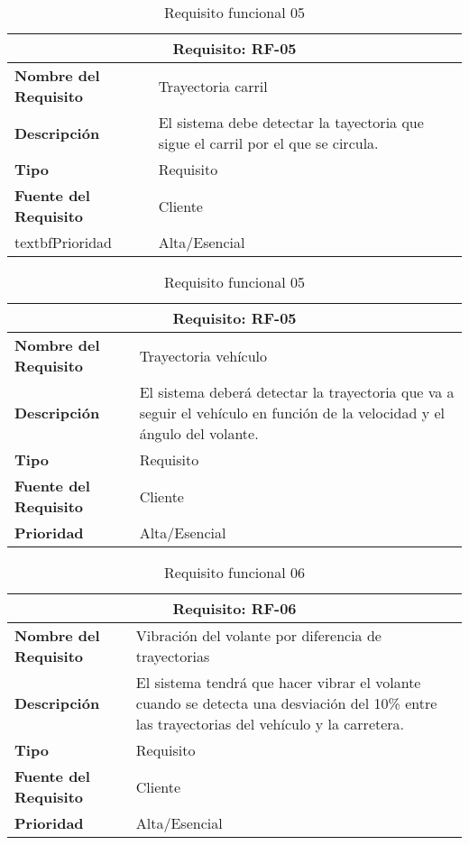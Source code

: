 \begin{table}[H]
\begin{center}
\begin{tabular}{p{} p{7cm}}
\multicolumn{2}{c}{\textbf{Requisito: RF-05} } \\
\hline \hline
\textbf{Nombre del Requisito} & Trayectoria carril\\
\hline
\textbf{Descripción} & El sistema debe detectar la tayectoria que sigue el carril por el que se circula. \\
\hline
\textbf{Tipo} & Requisito  \\
\hline
\textbf{Fuente del Requisito} & Cliente  \\
\hline
textbf{Prioridad} & Alta/Esencial  \\ \hline
\end{tabular}
\caption{Requisito funcional 05}
\label{tab:personal}
\end{center}
\end{table}

\begin{table}[H]
\begin{center}
\begin{tabular}{p{} p{7cm}}
\multicolumn{2}{c}{\textbf{Requisito: RF-05} } \\
\hline \hline
\textbf{Nombre del Requisito} & Trayectoria vehículo\\
\hline
\textbf{Descripción} & El sistema deberá detectar la trayectoria que va a seguir el vehículo en función de la velocidad y el ángulo del volante. \\
\hline
\textbf{Tipo} & Requisito  \\
\hline
\textbf{Fuente del Requisito} & Cliente  \\
\hline
\textbf{Prioridad} & Alta/Esencial  \\ \hline
\end{tabular}
\caption{Requisito funcional 05}
\label{tab:personal}
\end{center}
\end{table}

\begin{table}[H]
\begin{center}
\begin{tabular}{p{} p{7cm}}
\multicolumn{2}{c}{\textbf{Requisito: RF-06} } \\
\hline \hline
\textbf{Nombre del Requisito} &  Vibración del volante por diferencia de trayectorias\\
\hline
\textbf{Descripción} & El sistema tendrá que hacer vibrar el volante cuando se detecta una desviación del 10\% entre las trayectorias del vehículo y la carretera. \\
\hline
\textbf{Tipo} & Requisito  \\
\hline
\textbf{Fuente del Requisito} & Cliente  \\
\hline
\textbf{Prioridad} & Alta/Esencial  \\ \hline
\end{tabular}
\caption{Requisito funcional 06}
\label{tab:RF-06}
\end{center}
\end{table}


